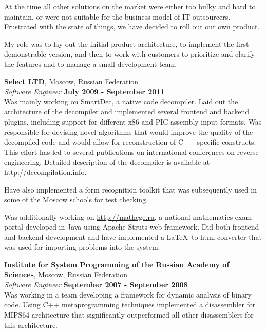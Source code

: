 \documentclass[margin,line]{CV}
\begin{document}
\begin{resume}
    At the time all other solutions on the market were either too bulky and hard to maintain, or were not suitable for the business model of IT outsourcers. Frustrated with the state of things, we have decided to roll out our own product.

    My role was to lay out the initial product architecture, to implement the first demonstrable version, and then to work with customers to prioritize and clarify the features and to manage a small development team. 
    

    
    \textbf{Select LTD}, Moscow, Russian Federation \vspace{2mm}\\\vspace{1mm}%
    \textsl{Software Engineer} \hfill \textbf{July 2009 - September 2011}\\
    Was mainly working on SmartDec, a native code decompiler. Laid out the architecture of the decompiler and implemented several frontend and backend plugins, including support for different x86 and PIC assembly input formats. Was responsible for devising novel algorithms that would improve the quality of the decompiled code and would allow for reconstruction of C++-specific constructs. This effort has led to several publications on international conferences on reverse engineering. Detailed description of the decompiler is available at \url{http://decompilation.info}.

    Have also implemented a form recognition toolkit that was subsequently used in some of the Moscow schools for test checking. 

    Was additionally working on \url{http://mathege.ru}, a national mathematics exam portal developed in Java using Apache Struts web framework. Did both frontend and backend development and have implemented a \LaTeX~to html converter that was used for importing problems into the system.

    
    \textbf{Institute for System Programming of the Russian Academy of Sciences}, Moscow, Russian Federation \vspace{2mm}\\\vspace{1mm}%
    \textsl{Software Engineer} \hfill \textbf{September 2007 - September 2008}\\
    Was working in a team developing a framework for dynamic analysis of binary code. Using C++ metaprogramming techniques implemented a disassembler for MIPS64 architecture that significantly outperformed all other disassemblers for this architecture.


\end{resume}
\end{document}
